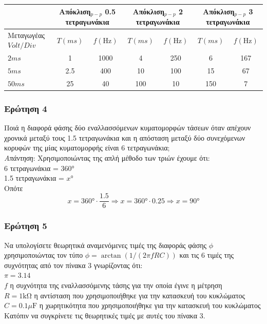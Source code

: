 \documentclass{article}
\begin{document}
\begin{center}
\begin{tabular}{|p{20mm}|c|c|c|c|c|c|}
        \hline
        &
        \multicolumn{2}{p{27mm}|}{Απόκλιση$_{p-p}$ 0.5 τετραγωνάκια} &
        \multicolumn{2}{p{27mm}|}{Απόκλιση$_{p-p}$ 2 τετραγωνάκια} &
        \multicolumn{2}{p{27mm}|}{Απόκλιση$_{p-p}$ 3 τετραγωνάκια} \\
        \hline
        Μεταγωγέας $Volt / Div$ & $T(ms)$ & $f(\si{\hertz})$ &
        $T(ms)$ & $f(\si{\hertz})$ & $T(ms)$ & $f(\si{\hertz})$ \\
        \hline
        $2 ms$ & 1 & 1000 & 4 & 250 & 6 & 167 \\
        \hline
        $5 ms$ & 2.5 & 400 & 10 & 100 & 15 & 67 \\
        \hline
        $50 ms$ & 25 & 40 & 100 & 10 & 150 & 7 \\
        \hline
\end{tabular}
\end{center}

\subsubsection{Ερώτηση 4}
Ποιά η διαφορά φάσης δύο εναλλασσόμενων κυματομορφών τάσεων όταν απέχουν
χρονικά μεταξύ τους 1.5 τετραγωνάκια και η απόσταση μεταξύ δύο συνεχόμενων
κορυφών της μίας κυματομορφής είναι 6 τετραγωνάκια; \\

\textit{Απάντηση}: Χρησιμοποιώντας της απλή μέθοδο των τριών έχουμε ότι: \\
6 τετραγωνάκια = $360\si{\degree}$ \\
1.5 τετραγωνάκια = $x\si{\degree}$ \\
Οπότε
\[x = 360 \si{\degree} \cdot \frac{1.5}{6} \Rightarrow x = 360\si{\degree} \cdot 0.25
        \Rightarrow x = 90\si{\degree}\]

\subsubsection{Ερώτηση 5}
Να υπολογίσετε θεωρητικά αναμενόμενες τιμές της διαφοράς φάσης $\phi$
χρησιμοποιώντας τον τύπο $\phi = \arctan(1 / (2 \pi f RC))$ και τις 6 τιμές
της συχνότητας από τον πίνακα 3 γνωρίζοντας ότι: \\
$\pi = 3.14$ \\
$f$ η συχνότητα της εναλλασσόμενης τάσης για την οποία έγινε η μέτρηση \\
$R = 1\si{\kohm}$ η αντίσταση που χρησιμοποιήθηκε για την κατασκευή του κυκλώματος \\
$C = 0.1\si{\mu\farad}$ η χωρητικότητα που χρησιμοποιήθηκε για την κατασκευή του κυκλώματος \\
Κατόπιν να συγκρίνετε τις θεωρητικές τιμές με αυτές του πίνακα 3. \\
\end{document}
